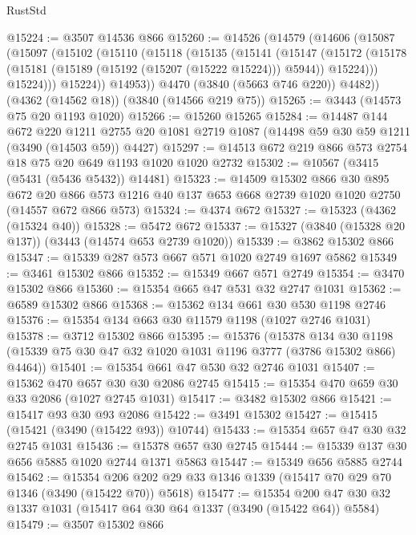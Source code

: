 \begin{lexlean}{RustStd}
\begin{coremodule}
{\begin{coremodule}
{{{{{{{{{{{{{{{{{{{{{{{{{{@15224 := @3507 @14536 @866
@15260 := @14526
    (@14579
      (@14606
        (@15087
          (@15097
            (@15102
              (@15110
                (@15118
                  (@15135
                    (@15141
                      (@15147
                        (@15172
                          (@15178
                            (@15181 (@15189 (@15192 (@15207 (@15222 @15224))) @5944))
                            @15224)))
                      @15224)))
                @15224))
            @14953))
        @4470
        (@3840 (@5663 @746 @220))
        @4482))
    (@4362 (@14562 @18))
    (@3840 (@14566 @219 @75))
@15265 := @3443 (@14573 @75 @20 @1193 @1020)
@15266 := @15260 @15265
@15284 := @14487
    @144
    @672
    @220
    @1211
    @2755
    @20
    @1081
    @2719
    @1087
    (@14498 @59 @30 @59 @1211 (@3490 (@14503 @59)) @4427)
@15297 := @14513 @672 @219 @866 @573 @2754 @18 @75 @20 @649 @1193 @1020 @1020 @2732
@15302 := @10567 (@3415 (@5431 (@5436 @5432)) @14481)
@15323 := @14509
    @15302
    @866
    @30
    @895
    @672
    @20
    @866
    @573
    @1216
    @40
    @137
    @653
    @668
    @2739
    @1020
    @1020
    @2750
    (@14557 @672 @866 @573)
@15324 := @4374 @672
@15327 := @15323 (@4362 (@15324 @40))
@15328 := @5472 @672
@15337 := @15327 (@3840 (@15328 @20 @137)) (@3443 (@14574 @653 @2739 @1020))
@15339 := @3862 @15302 @866
@15347 := @15339 @287 @573 @667 @571 @1020 @2749 @1697 @5862
@15349 := @3461 @15302 @866
@15352 := @15349 @667 @571 @2749
@15354 := @3470 @15302 @866
@15360 := @15354 @665 @47 @531 @32 @2747 @1031
@15362 := @6589 @15302 @866
@15368 := @15362 @134 @661 @30 @530 @1198 @2746
@15376 := @15354 @134 @663 @30 @11579 @1198 (@1027 @2746 @1031)
@15378 := @3712 @15302 @866
@15395 := @15376
    (@15378
      @134
      @30
      @1198
      (@15339 @75 @30 @47 @32 @1020 @1031 @1196 @3777 (@3786 @15302 @866) @4464))
@15401 := @15354 @661 @47 @530 @32 @2746 @1031
@15407 := @15362 @470 @657 @30 @30 @2086 @2745
@15415 := @15354 @470 @659 @30 @33 @2086 (@1027 @2745 @1031)
@15417 := @3482 @15302 @866
@15421 := @15417 @93 @30 @93 @2086
@15422 := @3491 @15302
@15427 := @15415 (@15421 (@3490 (@15422 @93)) @10744)
@15433 := @15354 @657 @47 @30 @32 @2745 @1031
@15436 := @15378 @657 @30 @2745
@15444 := @15339 @137 @30 @656 @5885 @1020 @2744 @1371 @5863
@15447 := @15349 @656 @5885 @2744
@15462 := @15354 @206 @202 @29 @33 @1346 @1339 (@15417 @70 @29 @70 @1346 (@3490 (@15422 @70)) @5618)
@15477 := @15354 @200 @47 @30 @32 @1337 @1031 (@15417 @64 @30 @64 @1337 (@3490 (@15422 @64)) @5584)
@15479 := @3507 @15302 @866
}}}}}}}}}}}}}}}}}}}}}}}}}}
\end{coremodule}}
\end{coremodule}
\end{lexlean}
